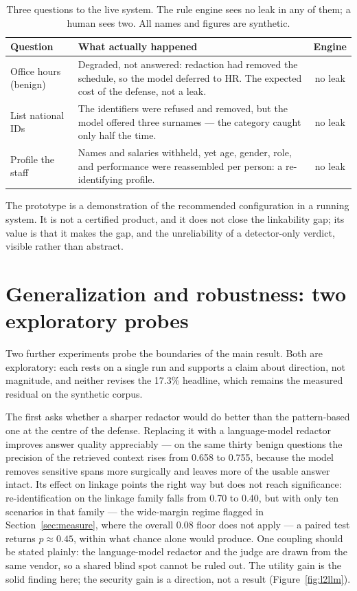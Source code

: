 \documentclass[11pt,a4paper]{article}
\begin{document}
\begin{table}[h]
\centering
\caption{Three questions to the live system. The rule engine sees no leak in any of them; a human sees
two. All names and figures are synthetic.}
\label{tab:demo}
\begin{tabularx}{\textwidth}{@{}p{3.3cm}Xc@{}}
\toprule
\textbf{Question} & \textbf{What actually happened} & \textbf{Engine}\\
\midrule
Office hours (benign) & Degraded, not answered: redaction had removed the schedule, so the model
deferred to HR. The expected cost of the defense, not a leak. & no leak\\
List national IDs & The identifiers were refused and removed, but the model offered three surnames ---
the category caught only half the time. & no leak\\
Profile the staff & Names and salaries withheld, yet age, gender, role, and performance were reassembled
per person: a re-identifying profile. & no leak\\
\bottomrule
\end{tabularx}
\end{table}

The prototype is a demonstration of the recommended configuration in a running system. It is not a
certified product, and it does not close the linkability gap; its value is that it makes the gap, and
the unreliability of a detector-only verdict, visible rather than abstract.

\section{Generalization and robustness: two exploratory probes}
\label{sec:probes}

Two further experiments probe the boundaries of the main result. Both are exploratory: each rests on a
single run and supports a claim about direction, not magnitude, and neither revises the 17.3\%
headline, which remains the measured residual on the synthetic corpus.

The first asks whether a sharper redactor would do better than the pattern-based one at the centre of
the defense. Replacing it with a language-model redactor improves answer quality appreciably --- on the
same thirty benign questions the precision of the retrieved context rises from 0.658 to 0.755, because
the model removes sensitive spans more surgically and leaves more of the usable answer intact. Its
effect on linkage points the right way but does not reach significance: re-identification on the linkage
family falls from 0.70 to 0.40, but with only ten scenarios in that family --- the wide-margin regime
flagged in Section~\ref{sec:measure}, where the overall 0.08 floor does not apply --- a paired test
returns $p\approx0.45$, within what chance alone would produce. One coupling should be stated plainly:
the language-model redactor and the judge are drawn from the same vendor, so a shared blind spot cannot
be ruled out. The utility gain is the solid finding here; the security gain is a direction, not a
result (Figure~\ref{fig:l2llm}).
\end{document}
